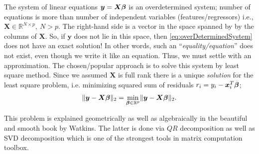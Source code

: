 The system of linear equations  $\bm y = \bm X \bm \beta$
is an overdetermined system; number of equations is more than
number of independent variables (features/regressors) i.e., 
$\bm X \in \mathbb{R}^{N \times p},~ N > p$.
The right-hand side is a vector in the space spanned by 
by the columns of $\bm X$. So, if $\bm y$ 
does not lie in this space,
then \cref{eq:overDeterminedSystem} 
does not have an exact solution!
In other words, such an ``\emph{equality/equation}'' does not exist, 
even though we write it like an equation. Thus, we must
settle with an approximation. The chosen/popular approach
is to solve this system by least square method.
Since we assumed $\bm X$ is full rank there is a unique
\emph{solution} for the least square problem, 
i.e. minimizing squared 
sum of residuals
$ r_i = y_i -  \bm x_i^T \bm \beta$; 
\[ \lVert{\bm y - \bm X {\bm \beta}}\rVert_2 =\min_{\bm \beta \in \mathbb{R}^p} \lVert{\bm y - \bm X \bm \beta}\rVert_2.\]

This problem is explained geometrically as well as algebraically
in the beautiful and smooth book by Watkins\cite{watkinsfund}.
The latter is done via $QR$ decomposition 
as well as SVD decomposition
which is one of the strongest tools in matrix 
computation toolbox. 

